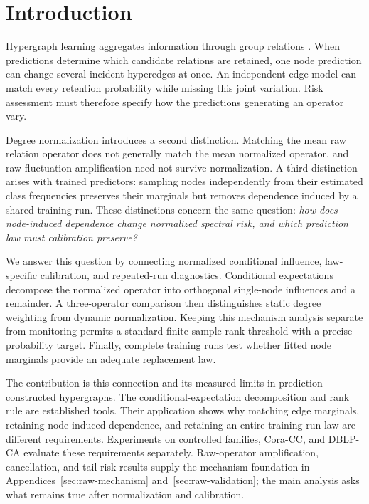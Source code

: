 \section{Introduction}\label{sec:intro}

Hypergraph learning aggregates information through group relations
\cite{feng2019hgnn,chien2022allset}. When predictions determine which
candidate relations are retained, one node prediction can change several
incident hyperedges at once. An independent-edge model can match every
retention probability while missing this joint variation. Risk assessment
must therefore specify how the predictions generating an operator vary.

Degree normalization introduces a second distinction. Matching the mean
raw relation operator does not generally match the mean normalized
operator, and raw fluctuation amplification need not survive
normalization. A third distinction arises with trained predictors:
sampling nodes independently from their estimated class frequencies
preserves their marginals but removes dependence induced by a shared
training run. These distinctions concern the same question:
\emph{how does node-induced dependence change normalized spectral risk,
and which prediction law must calibration preserve?}

We answer this question by connecting normalized conditional influence,
law-specific calibration, and repeated-run diagnostics. Conditional
expectations decompose the normalized operator into orthogonal
single-node influences and a remainder. A three-operator comparison then
distinguishes static degree weighting from dynamic normalization.
Keeping this mechanism analysis separate from monitoring permits a
standard finite-sample rank threshold with a precise probability target.
Finally, complete training runs test whether fitted node marginals
provide an adequate replacement law.

The contribution is this connection and its measured limits in
prediction-constructed hypergraphs. The conditional-expectation
decomposition and rank rule are established tools. Their application
shows why matching edge marginals, retaining node-induced dependence,
and retaining an entire training-run law are different requirements.
Experiments on controlled families, Cora-CC, and DBLP-CA evaluate these
requirements separately. Raw-operator amplification, cancellation, and
tail-risk results supply the mechanism foundation in
Appendices~\ref{sec:raw-mechanism} and~\ref{sec:raw-validation}; the
main analysis asks what remains true after normalization and calibration.

